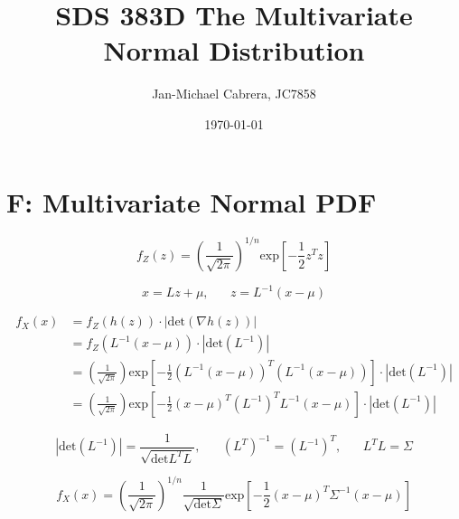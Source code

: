 \documentclass[12pt]{article}
\begin{document}
    \title{SDS 383D The Multivariate Normal Distribution}
    \author{Jan-Michael Cabrera, JC7858}
    \date{\today}
    \maketitle

    \section*{F: Multivariate Normal PDF}

        \begin{equation}
            f_Z(z) = \left ( \frac{1}{\sqrt{2 \pi}}\right)^{1/n} \text{exp} \left [ -\frac{1}{2} z^T z\right]
        \end{equation}

        \begin{equation}
            x = Lz + \mu, \hspace{20pt} z = L^{-1}(x - \mu)
        \end{equation}

        \begin{align}
            f_X(x) &= f_Z(h(z))\cdot|\text{det}(\nabla h(z))| \\
            &= f_Z(L^{-1}(x-\mu)) \cdot |\text{det}(L^{-1})| \\
            &= \left( \frac{1}{\sqrt{2 \pi}}\right) \text{exp}\left[ -\frac{1}{2}(L^{-1}(x-\mu))^T (L^{-1}(x-\mu))\right]\cdot |\text{det}(L^{-1})| \\
            &= \left( \frac{1}{\sqrt{2 \pi}}\right) \text{exp}\left[ -\frac{1}{2}(x-\mu)^T (L^{-1})^T L^{-1}(x-\mu)\right]\cdot |\text{det}(L^{-1})|
        \end{align}

        \begin{equation}
            |\text{det}(L^{-1})| = \frac{1}{\sqrt{\text{det}L^T L}}, \hspace{20pt}(L^T)^{-1} = (L^{-1})^T, \hspace{20pt} L^TL = \Sigma
        \end{equation}

        \begin{equation}
            f_X(x) = \left ( \frac{1}{\sqrt{2 \pi}}\right)^{1/n} \frac{1}{\sqrt{\text{det}\Sigma}} \text{exp} \left [ -\frac{1}{2} (x-\mu)^T \Sigma^{-1} (x-\mu)\right]
        \end{equation}
\end{document}
